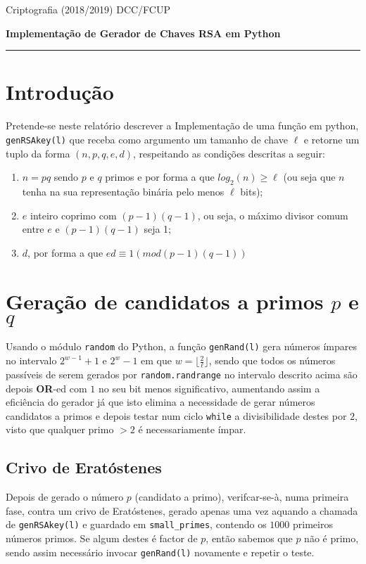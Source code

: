 \documentclass[dvipsnames]{article}
\begin{document}
Criptografia (2018/2019)
\hfill DCC/FCUP

\begin{center}\LARGE\bf 
  Implementação de Gerador de Chaves RSA em Python \\
\end{center}

\vskip 0.4cm
\hrule
\vskip 0.4cm

\section{Introdução}
Pretende-se neste relatório descrever a Implementação de uma função em python, \texttt{genRSAkey(l)} que receba como argumento um tamanho de chave $\ell$ e retorne um tuplo da forma $(n,p,q,e,d)$, respeitando as condições descritas a seguir:
\begin{enumerate}
  \item $n=pq$ sendo $p$ e $q$ primos e por forma a que $log_2(n) \geq \ell$ (ou seja que $n$ tenha na sua representação binária pelo menos $\ell$ bits);
  \item $e$ inteiro coprimo com $(p-1)(q-1)$, ou seja, o máximo divisor comum entre $e$ e $(p-1)(q-1)$ seja 1;
  \item $d$, por forma a que $ed \equiv 1 (mod (p-1)(q-1))$
\end{enumerate}

\section{Geração de candidatos a primos $p$ e $q$}
Usando o módulo \texttt{random} do Python, a função \texttt{genRand(l)} gera números ímpares no intervalo $2^{w-1} + 1$ e $2^{w} - 1$ em que $w=\lfloor \frac{2}{\ell} \rfloor$, sendo que todos os números passíveis de serem gerados por \texttt{random.randrange} no intervalo descrito acima são depois \textbf{OR}-ed com $1$ no seu bit menos significativo, aumentando assim a eficiência do gerador já que isto elimina a necessidade de gerar números candidatos a primos e depois testar num ciclo \texttt{while} a divisibilidade destes por $2$, visto que qualquer primo $>2$ é necessariamente ímpar.

\vskip 0.4cm

\subsection{Crivo de Eratóstenes}

Depois de gerado o número $p$ (candidato a primo), verifcar-se-à, numa primeira fase, contra um crivo de Eratóstenes, gerado apenas uma vez aquando a chamada de \texttt{genRSAkey(l)} e guardado em \texttt{small\_primes}, contendo os $1000$ primeiros números primos. Se algum destes é factor de $p$, então sabemos que $p$ não é primo, sendo assim necessário invocar \texttt{genRand(l)} novamente e repetir o teste.
\end{document}
